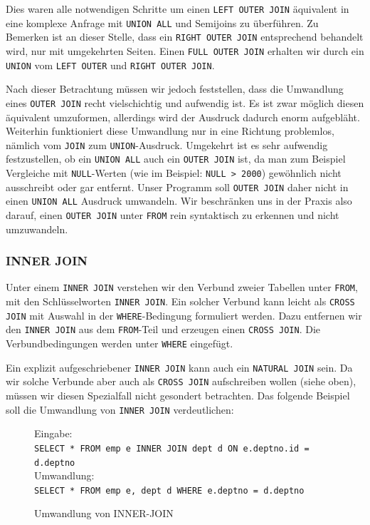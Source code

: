 Dies waren alle notwendigen Schritte um einen \verb|LEFT OUTER JOIN| äquivalent in eine komplexe Anfrage mit \verb|UNION ALL| und Semijoins zu überführen. Zu Bemerken ist an dieser Stelle, dass ein \verb|RIGHT OUTER JOIN| entsprechend behandelt wird, nur mit umgekehrten Seiten. Einen \verb|FULL OUTER JOIN| erhalten wir durch ein \verb|UNION| vom \verb|LEFT OUTER| und \verb|RIGHT OUTER JOIN|. 

Nach dieser Betrachtung müssen wir jedoch feststellen, dass die Umwandlung eines \verb|OUTER JOIN| recht vielschichtig und aufwendig ist. Es ist zwar möglich diesen äquivalent umzuformen, allerdings wird der Ausdruck dadurch enorm aufgebläht. Weiterhin funktioniert diese Umwandlung nur in eine Richtung problemlos, nämlich vom \verb|JOIN| zum \verb|UNION|-Ausdruck. Umgekehrt ist es sehr aufwendig festzustellen, ob ein \verb|UNION ALL| auch ein \verb|OUTER JOIN| ist, da man zum Beispiel Vergleiche mit \verb|NULL|-Werten (wie im Beispiel: \verb|NULL > 2000|) gewöhnlich nicht ausschreibt oder gar entfernt. Unser Programm soll \verb|OUTER JOIN| daher nicht in einen \verb|UNION ALL| Ausdruck umwandeln. Wir beschränken uns in der Praxis also darauf, einen \verb|OUTER JOIN| unter \verb|FROM| rein syntaktisch zu erkennen und nicht umzuwandeln. 

\subsubsection*{INNER JOIN}

Unter einem \verb|INNER JOIN| verstehen wir den Verbund zweier Tabellen unter \verb|FROM|, mit den Schlüsselworten \verb|INNER JOIN|. Ein solcher Verbund kann leicht als \verb|CROSS JOIN| mit Auswahl in der \verb|WHERE|-Bedingung formuliert werden. Dazu entfernen wir den \verb|INNER JOIN| aus dem \verb|FROM|-Teil und erzeugen einen \verb|CROSS JOIN|. Die Verbundbedingungen werden unter \verb|WHERE| eingefügt.

Ein explizit aufgeschriebener \verb|INNER JOIN| kann auch ein \verb|NATURAL JOIN| sein. Da wir solche Verbunde aber auch als \verb|CROSS JOIN| aufschreiben wollen (siehe oben), müssen wir diesen Spezialfall nicht gesondert betrachten. Das folgende Beispiel soll die Umwandlung von \verb|INNER JOIN| verdeutlichen:

\begin{figure}[h]
Eingabe:\\
\verb|SELECT * FROM emp e INNER JOIN dept d ON e.deptno.id = d.deptno|\\

Umwandlung:\\
\verb|SELECT * FROM emp e, dept d WHERE e.deptno = d.deptno|\\
\caption{Umwandlung von INNER-JOIN}
\end{figure}


